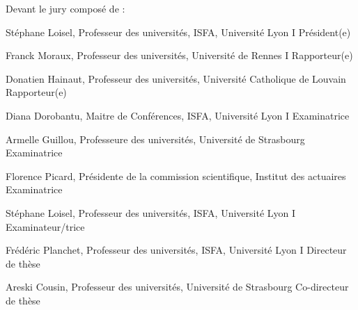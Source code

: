 \begin{titlepage}
\fontsize{11pt}{13pt}\selectfont
Devant le jury compos\'e de :
\medskip

\fontsize{9pt}{11pt}\selectfont

St\'ephane Loisel, Professeur des universit\'es, ISFA, Universit\'e Lyon I \hfill Pr\'esident(e)

\medskip

Franck Moraux, Professeur des universit\'es, Universit\'e de Rennes I \hfill  Rapporteur(e)

Donatien Hainaut,  Professeur des universit\'es, Universit\'e Catholique de Louvain \hfill Rapporteur(e)

Diana Dorobantu, Maitre de Conf\'erences, ISFA, Universit\'e Lyon I \hfill Examinatrice

Armelle Guillou, Professeure des universit\'es, Universit\'e de Strasbourg \hfill Examinatrice

Florence Picard, Pr\'esidente de la commission scientifique, Institut des actuaires \hfill Examinatrice

St\'ephane Loisel, Professeur des universit\'es, ISFA, Universit\'e Lyon I \hfill Examinateur/trice

\medskip

Fr\'ed\'eric Planchet, Professeur des universit\'es, ISFA, Universit\'e Lyon I \hfill Directeur de thèse

Areski Cousin, Professeur des universit\'es, Universit\'e de Strasbourg \hfill Co-directeur de thèse %

\newpage
\end{titlepage}


